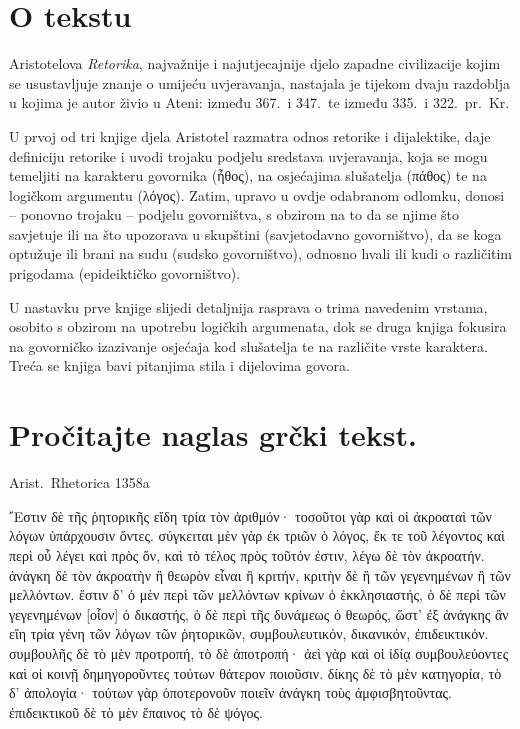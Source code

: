 


\section*{O tekstu}

Aristotelova \textit{Retorika}, najvažnije i najutjecajnije djelo zapadne civilizacije kojim se usustavljuje znanje o umijeću uvjeravanja, nastajala je tijekom dvaju razdoblja u kojima je autor živio u Ateni: između 367.\ i 347.\ te između 335.\ i 322.\ pr.~Kr. 

U prvoj od tri knjige djela Aristotel razmatra odnos retorike i dijalektike, daje definiciju retorike i uvodi trojaku podjelu sredstava uvjeravanja, koja se mogu temeljiti na karakteru govornika \textgreek[variant=ancient]{(ἦθος),} na osjećajima slušatelja \textgreek[variant=ancient]{(πάθος)} te na logičkom argumentu \textgreek[variant=ancient]{(λόγος).} Zatim, upravo u ovdje odabranom odlomku, donosi – ponovno trojaku – podjelu govorništva, s obzirom na to da se njime što savjetuje ili na što upozorava u skupštini (savjetodavno govorništvo), da se koga optužuje ili brani na sudu (sudsko govorništvo), odnosno hvali ili kudi o različitim prigodama (epideiktičko govorništvo). 

U nastavku prve knjige slijedi detaljnija rasprava o trima navedenim vrstama, osobito s obzirom na upotrebu logičkih argumenata, dok se druga knjiga fokusira na govorničko izazivanje osjećaja kod slušatelja te na različite vrste karaktera. Treća se knjiga bavi pitanjima stila i dijelovima govora.



\section*{Pročitajte naglas grčki tekst.}
Arist.\ Rhetorica 1358a

\medskip

{\large
\begin{greek}
\noindent ῎Εστιν δὲ τῆς ῥητορικῆς εἴδη τρία τὸν ἀριθμόν· τοσοῦτοι γὰρ καὶ οἱ ἀκροαταὶ τῶν λόγων ὑπάρχουσιν ὄντες. σύγκειται μὲν γὰρ ἐκ τριῶν ὁ λόγος, ἔκ τε τοῦ λέγοντος καὶ περὶ οὗ λέγει καὶ πρὸς ὅν, καὶ τὸ τέλος πρὸς τοῦτόν ἐστιν, λέγω δὲ τὸν ἀκροατήν. ἀνάγκη δὲ τὸν ἀκροατὴν ἢ θεωρὸν εἶναι ἢ κριτήν, κριτὴν δὲ ἢ τῶν γεγενημένων ἢ τῶν μελλόντων. ἔστιν δ' ὁ μὲν περὶ τῶν μελλόντων κρίνων ὁ ἐκκλησιαστής, ὁ δὲ περὶ τῶν γεγενημένων [οἷον] ὁ δικαστής, ὁ δὲ περὶ τῆς δυνάμεως ὁ θεωρός, ὥστ' ἐξ ἀνάγκης ἂν εἴη τρία γένη τῶν λόγων τῶν ῥητορικῶν, συμβουλευτικόν, δικανικόν, ἐπιδεικτικόν. συμβουλῆς δὲ τὸ μὲν προτροπή, τὸ δὲ ἀποτροπή· ἀεὶ γὰρ καὶ οἱ ἰδίᾳ συμβουλεύοντες καὶ οἱ κοινῇ δημηγοροῦντες τούτων θάτερον ποιοῦσιν. δίκης δὲ τὸ μὲν κατηγορία, τὸ δ' ἀπολογία· τούτων γὰρ ὁποτερονοῦν ποιεῖν ἀνάγκη τοὺς ἀμφισβητοῦντας. ἐπιδεικτικοῦ δὲ τὸ μὲν ἔπαινος τὸ δὲ ψόγος.

\end{greek}
}



